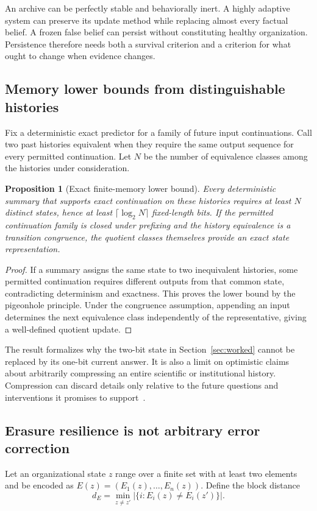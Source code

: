 \documentclass[11pt,letterpaper]{article}
\theoremstyle{plain}
\newtheorem{proposition}{Proposition}[section]
\theoremstyle{definition}
\theoremstyle{remark}
\newcommand{\abs}[1]{\left\lvert#1\right\rvert}
\begin{document}
An archive can be perfectly stable and behaviorally inert. A highly adaptive system can preserve its update method while replacing almost every factual belief. A frozen false belief can persist without constituting healthy organization. Persistence therefore needs both a survival criterion and a criterion for what ought to change when evidence changes.

\subsection{Memory lower bounds from distinguishable histories}
Fix a deterministic exact predictor for a family of future input continuations. Call two past histories equivalent when they require the same output sequence for every permitted continuation. Let $N$ be the number of equivalence classes among the histories under consideration.

\begin{proposition}[Exact finite-memory lower bound]\label{prop:memory}
Every deterministic summary that supports exact continuation on these histories requires at least $N$ distinct states, hence at least $\lceil\log_2N\rceil$ fixed-length bits. If the permitted continuation family is closed under prefixing and the history equivalence is a transition congruence, the quotient classes themselves provide an exact state representation.
\end{proposition}
\begin{proof}
If a summary assigns the same state to two inequivalent histories, some permitted continuation requires different outputs from that common state, contradicting determinism and exactness. This proves the lower bound by the pigeonhole principle. Under the congruence assumption, appending an input determines the next equivalence class independently of the representative, giving a well-defined quotient update.
\end{proof}

The result formalizes why the two-bit state in Section~\ref{sec:worked} cannot be replaced by its one-bit current answer. It is also a limit on optimistic claims about arbitrarily compressing an entire scientific or institutional history. Compression can discard details only relative to the future questions and interventions it promises to support~\cite{tishby}.

\subsection{Erasure resilience is not arbitrary error correction}
Let an organizational state $z$ range over a finite set with at least two elements and be encoded as $E(z)=(E_1(z),\ldots,E_n(z))$. Define the block distance
\[
d_E=\min_{z\ne z'}\abs{\{i:E_i(z)\ne E_i(z')\}}.
\]
\end{document}
